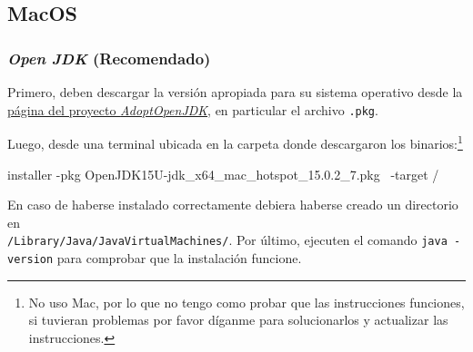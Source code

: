 \subsection{MacOS}
  \subsubsection{\textit{Open JDK} (Recomendado)}
    Primero, deben descargar la versión apropiada para su sistema operativo desde la 
    \href{https://adoptopenjdk.net/releases.html?variant=openjdk15&jvmVariant=hotspot}{página del 
    proyecto \textit{AdoptOpenJDK}}, en particular el archivo \texttt{.pkg}.

    Luego, desde una terminal ubicada en la carpeta donde descargaron los binarios:\footnote{No uso 
    Mac, por lo que no tengo como probar que las instrucciones funciones, si tuvieran problemas por 
    favor díganme para solucionarlos y actualizar las instrucciones.}

    \begin{bash}
      installer -pkg OpenJDK15U-jdk_x64_mac_hotspot_15.0.2_7.pkg \
        -target /
    \end{bash}

    En caso de haberse instalado correctamente debiera haberse creado un directorio en \\
    \texttt{/Library/Java/JavaVirtualMachines/}.
    Por último, ejecuten el comando \texttt{java -version} para comprobar que la instalación 
    funcione.